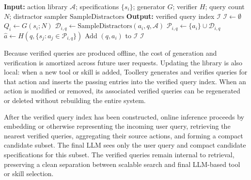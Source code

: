 \begin{algorithm}[t]
\caption{Offline Construction of the Verified Query Index}
\label{alg:verified_query_index}
\begin{algorithmic}[1]
\State \textbf{Input:} action library $\mathcal{A}$; specifications $\{s_i\}$; generator $G$; verifier $H$; query count $N$; distractor sampler $\mathrm{SampleDistractors}$
\State \textbf{Output:} verified query index $\mathcal{I}$
\State $\mathcal{I} \leftarrow \emptyset$
    \State $Q_i \leftarrow G(s_i; N)$ 
        \State $\mathcal{D}_{i,q} \leftarrow \mathrm{SampleDistractors}(a_i, q, \mathcal{A})$
        \State $\mathcal{P}_{i,q} \leftarrow \{a_i\} \cup \mathcal{D}_{i,q}$
        \State $\hat{a} \leftarrow H(q, \{s_j : a_j \in \mathcal{P}_{i,q}\})$
            \State Add $(q, a_i)$ to $\mathcal{I}$ 
        \EndIf
    \EndFor
\EndFor
\State \Return $\mathcal{I}$
\end{algorithmic}
\end{algorithm}

Because verified queries are produced offline, the cost of generation and verification is amortized across future user requests. Updating the library is also local: when a new tool or skill is added, Toollery generates and verifies queries for that action and inserts the passing entries into the verified query index. When an action is modified or removed, its associated verified queries can be regenerated or deleted without rebuilding the entire system.

After the verified query index has been constructed, online inference proceeds by embedding or otherwise representing the incoming user query, retrieving the nearest verified queries, aggregating their source actions, and forming a compact candidate subset. The final LLM sees only the user query and compact candidate specifications for this subset. The verified queries remain internal to retrieval, preserving a clean separation between scalable search and final LLM-based tool or skill selection.
